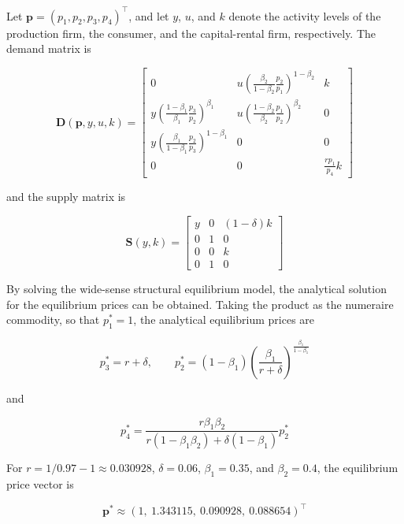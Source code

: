 \documentclass[
  letterpaper,
  DIV=11,
  numbers=noendperiod]{scrreprt}
\begin{document}
Let \(\mathbf p=(p_1,p_2,p_3,p_4)^\top\), and let \(y\), \(u\), and
\(k\) denote the activity levels of the production firm, the consumer,
and the capital-rental firm, respectively. The demand matrix is

\[
\mathbf D(\mathbf p,y,u,k)
=
\begin{bmatrix}
0
&
u\left(\frac{\beta_2}{1-\beta_2}\frac{p_2}{p_1}\right)^{1-\beta_2}
&
k
\\
y\left(\frac{1-\beta_1}{\beta_1}\frac{p_3}{p_2}\right)^{\beta_1}
&
u\left(\frac{1-\beta_2}{\beta_2}\frac{p_1}{p_2}\right)^{\beta_2}
&
0
\\
y\left(\frac{\beta_1}{1-\beta_1}\frac{p_2}{p_3}\right)^{1-\beta_1}
&
0
&
0
\\
0
&
0
&
\frac{rp_1}{p_4}k
\end{bmatrix}
\]

and the supply matrix is

\[
\mathbf S(y,k)
=
\begin{bmatrix}
y&0&(1-\delta)k\\
0&1&0\\
0&0&k\\
0&1&0
\end{bmatrix}
\]

By solving the wide-sense structural equilibrium model, the analytical
solution for the equilibrium prices can be obtained. Taking the product
as the numeraire commodity, so that \(p_1^*=1\), the analytical
equilibrium prices are

\[
p_3^*=r+\delta,
\qquad
p_2^*
=
(1-\beta_1)
\left(
\frac{\beta_1}{r+\delta}
\right)^{\frac{\beta_1}{1-\beta_1}}
\]

and

\[
p_4^*
=
\frac{
r\beta_1\beta_2
}{
r(1-\beta_1\beta_2)+\delta(1-\beta_1)
}
p_2^*
\]

For \(r=1/0.97-1\approx0.030928\), \(\delta=0.06\), \(\beta_1=0.35\),
and \(\beta_2=0.4\), the equilibrium price vector is

\[
\mathbf p^*
\approx
(1,\ 1.343115,\ 0.090928,\ 0.088654)^\top
\]
\end{document}
